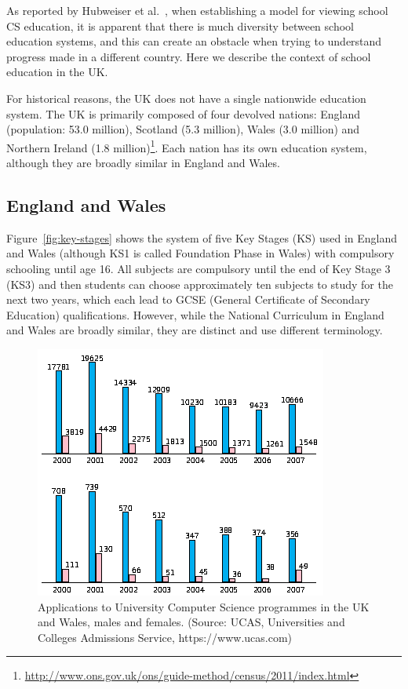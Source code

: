 \documentclass{sig-alternate}
\begin{document}
As reported by Hubweiser et al.~\cite{hubwieser-et-al:2011}, when establishing a
model for viewing school CS education, it is apparent that there is
much diversity between school education systems, and this can create
an obstacle when trying to understand progress made in a different
country. Here we describe the context of school education in the UK.

For historical reasons, the UK does not have a single nationwide
education system.  The UK is primarily composed of four devolved
nations: England (population: 53.0 million), Scotland (5.3 million),
Wales (3.0 million) and Northern Ireland (1.8
million)\footnote{\url{http://www.ons.gov.uk/ons/guide-method/census/2011/index.html}}.
Each nation has its own education system, although they are broadly
similar in England and Wales.

\subsection{England and Wales}
Figure~\ref{fig:key-stages} shows the system of five Key Stages (KS)
used in England and Wales (although KS1 is called Foundation Phase in
Wales) with compulsory schooling until age 16. All subjects are
compulsory until the end of Key Stage 3 (KS3) and then students can
choose approximately ten subjects to study for the next two years,
which each lead to GCSE (General Certificate of Secondary Education)
qualifications. However, while the National Curriculum in England and
Wales are broadly similar, they are distinct and use different
terminology.

\begin{figure}
  \centering
  \includegraphics[width=0.9\columnwidth]{images/numbers.png}
  \caption{Applications to University Computer Science programmes
           in the UK and Wales, males and females.
           (Source: UCAS, Universities and Colleges Admissions Service,
            https://www.ucas.com)}
  \label{fig:numbers}
\end{figure}
\end{document}

